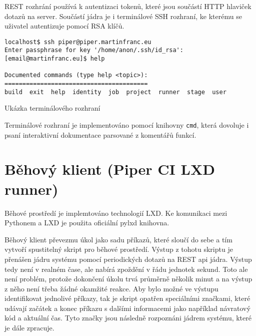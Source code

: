 REST rozhrání používá k autentizaci tokenů, které jsou součástí HTTP hlaviček dotazů na server.
Součástí jádra je i terminálové SSH rozhraní, ke kterému se uživatel autentizuje pomocí RSA klíčů.

\begin{listing}[ht]
\begin{verbatim}
localhost$ ssh piper@piper.martinfranc.eu
Enter passphrase for key '/home/anon/.ssh/id_rsa': 
[email@martinfranc.eu]$ help

Documented commands (type help <topic>):
========================================
build  exit  help  identity  job  project  runner  stage  user

\end{verbatim}
\caption{Ukázka terminálového rozhraní}
\end{listing}

Terminálové rozhraní je implementováno pomocí knihovny \verb|cmd|, která dovoluje i psaní interaktivní dokumentace parsované z komentářů funkcí.

\section{Běhový klient (Piper CI LXD runner)}

Běhové prostředí je implemtováno technologií LXD.
Ke komunikaci mezi Pythonem a LXD je použita oficiální pylxd knihovna.

Běhový klient převezmu úkol jako sadu příkazů, které sloučí do sebe a tím vytvoří spustitelný skript pro běhové prostředí.
Výstup z tohotu skriptu je přenášen jádru systému pomocí periodických dotazů na REST api jádra.
Výstup tedy není  v realném čase, ale nabírá zpoždění v řádu jednotek sekund.
Toto ale není problém, protože dokončení úkolu trvá průměrně několik minut a na výstup z něho není třeba žádné okamžité reakce.
Aby bylo možné ve výstupu identifikovat jednolivé příkazy, tak je skript opatřen speciálními značkami, které udávají začátek a konec příkazu s dalšími informacemi jako například návratový kód a aktuální čas.
Tyto značky jsou následně rozpoznáni jádrem systému, které je dále zpracuje.

